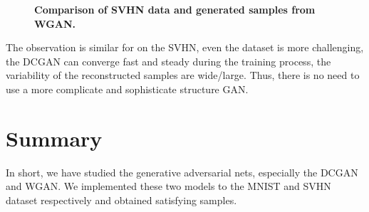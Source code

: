 \documentclass{article}
\newcommand{\mycaption}[2]{\caption[#1]{\textbf{#1.} #2}}
\begin{document}
\begin{figure}[!htb]
  \centering
  \mycaption{Comparison of SVHN data and generated samples from WGAN}{}
\end{figure}

The observation is similar for on the SVHN, even the dataset is more challenging, the DCGAN can converge fast and steady during the training process, the variability of the reconstructed samples are wide/large. Thus, there is no need to use a more complicate and sophisticate structure GAN. 

\section{Summary}

In short, we have studied the generative adversarial nets, especially the DCGAN and WGAN. We implemented these two models to the MNIST and SVHN dataset respectively and obtained satisfying samples.
\end{document}
